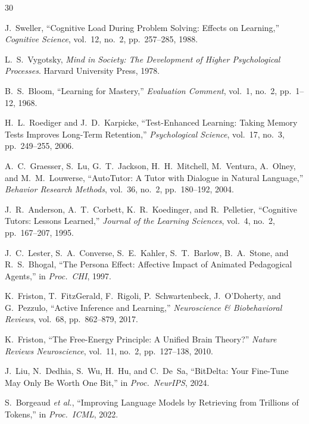 \documentclass[11pt,letterpaper]{article}
\begin{document}

\begin{thebibliography}{30}

J.~Sweller, ``Cognitive Load During Problem Solving: Effects on Learning,'' \emph{Cognitive Science}, vol.~12, no.~2, pp.~257--285, 1988.

L.~S.~Vygotsky, \emph{Mind in Society: The Development of Higher Psychological Processes}. Harvard University Press, 1978.

B.~S.~Bloom, ``Learning for Mastery,'' \emph{Evaluation Comment}, vol.~1, no.~2, pp.~1--12, 1968.

H.~L.~Roediger and J.~D.~Karpicke, ``Test-Enhanced Learning: Taking Memory Tests Improves Long-Term Retention,'' \emph{Psychological Science}, vol.~17, no.~3, pp.~249--255, 2006.

A.~C.~Graesser, S.~Lu, G.~T.~Jackson, H.~H.~Mitchell, M.~Ventura, A.~Olney, and M.~M.~Louwerse, ``AutoTutor: A Tutor with Dialogue in Natural Language,'' \emph{Behavior Research Methods}, vol.~36, no.~2, pp.~180--192, 2004.

J.~R.~Anderson, A.~T.~Corbett, K.~R.~Koedinger, and R.~Pelletier, ``Cognitive Tutors: Lessons Learned,'' \emph{Journal of the Learning Sciences}, vol.~4, no.~2, pp.~167--207, 1995.

J.~C.~Lester, S.~A.~Converse, S.~E.~Kahler, S.~T.~Barlow, B.~A.~Stone, and R.~S.~Bhogal, ``The Persona Effect: Affective Impact of Animated Pedagogical Agents,'' in \emph{Proc.\ CHI}, 1997.

K.~Friston, T.~FitzGerald, F.~Rigoli, P.~Schwartenbeck, J.~O'Doherty, and G.~Pezzulo, ``Active Inference and Learning,'' \emph{Neuroscience \& Biobehavioral Reviews}, vol.~68, pp.~862--879, 2017.

K.~Friston, ``The Free-Energy Principle: A Unified Brain Theory?'' \emph{Nature Reviews Neuroscience}, vol.~11, no.~2, pp.~127--138, 2010.

J.~Liu, N.~Dedhia, S.~Wu, H.~Hu, and C.~De~Sa, ``BitDelta: Your Fine-Tune May Only Be Worth One Bit,'' in \emph{Proc.\ NeurIPS}, 2024.

S.~Borgeaud \emph{et al.}, ``Improving Language Models by Retrieving from Trillions of Tokens,'' in \emph{Proc.\ ICML}, 2022.


\end{thebibliography}
\end{document}
